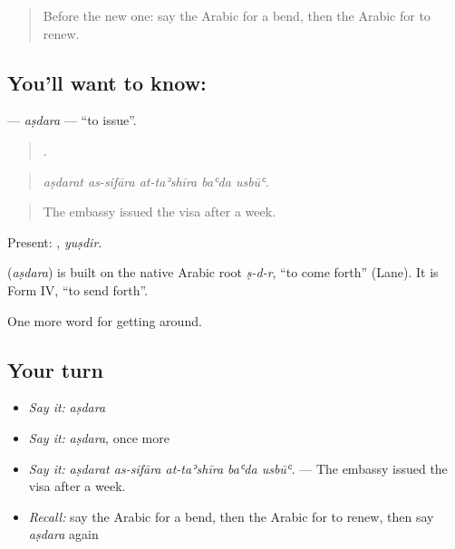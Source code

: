 \label{lesson:AR-C434-asdara}



\begin{quote}
Before the new one: say the Arabic for a bend, then the Arabic for to renew.
\end{quote}

\subsection*{You'll want to know: }
\textbf{} — \emph{aṣdara} — \textquotedblleft{}to issue\textquotedblright{}.

\begin{quote}
    .
\end{quote}

\begin{quote}
\emph{aṣdarat as-sifāra at-taʾshīra baʿda usbūʿ.}
\end{quote}

\begin{quote}
The embassy issued the visa after a week.
\end{quote}

Present: , \emph{yuṣdir}.

\begin{cousinweb}
\textbf{} (\emph{aṣdara}) is built on the native Arabic root \emph{ṣ-d-r}, \textquotedblleft{}to come forth\textquotedblright{} (Lane). It is Form IV, \textquotedblleft{}to send forth\textquotedblright{}.
\end{cousinweb}

\begin{grammarlens}[title={What you've built}]
One more word for getting around.
\end{grammarlens}

\subsection*{Your turn}
\begin{itemize}
\raggedright
  \item \emph{Say it:} \emph{aṣdara}
  \item \emph{Say it:} \emph{aṣdara}, once more
  \item \emph{Say it:} \emph{aṣdarat as-sifāra at-taʾshīra baʿda usbūʿ.} — The embassy issued the visa after a week.
  \item \emph{Recall:} say the Arabic for a bend, then the Arabic for to renew, then say \emph{aṣdara} again
\end{itemize}

